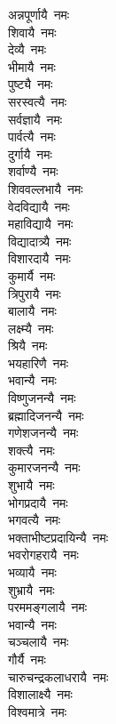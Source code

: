 \begin{multicols}{2}
\begin{flushleft}
अन्नपूर्णायै~नमः\\
शिवायै~नमः\\
देव्यै~नमः\\
भीमायै~नमः\\
पुष्ट्यै~नमः\\
सरस्वत्यै~नमः\\
सर्वज्ञायै~नमः\\
पार्वत्यै~नमः\\
दुर्गायै~नमः\\
शर्वाण्यै~नमः\hfill{}\\
शिववल्लभायै~नमः\\
वेदविद्यायै~नमः\\
महाविद्यायै~नमः\\
विद्यादात्र्यै~नमः\\
विशारदायै~नमः\\
कुमार्यै~नमः\\
त्रिपुरायै~नमः\\
बालायै~नमः\\
लक्ष्म्यै~नमः\\
श्रियै~नमः\hfill{}\\
भयहारिणै~नमः\\
भवान्यै~नमः\\
विष्णुजनन्यै~नमः\\
ब्रह्मादिजनन्यै~नमः\\
गणेशजनन्यै~नमः\\
शक्त्यै~नमः\\
कुमारजनन्यै~नमः\\
शुभायै~नमः\\
भोगप्रदायै~नमः\\
भगवत्यै~नमः\hfill{}\\
भक्ताभीष्टप्रदायिन्यै~नमः\\
भवरोगहरायै~नमः\\
भव्यायै~नमः\\
शुभ्रायै~नमः\\
परममङ्गलायै~नमः\\
भवान्यै~नमः\\
चञ्चलायै~नमः\\
गौर्यै~नमः\\
चारुचन्द्रकलाधरायै~नमः\\
विशालाक्ष्यै~नमः\hfill{}\\
विश्वमात्रे~नमः\\

\end{flushleft}
\end{multicols}
